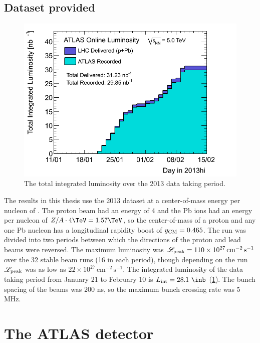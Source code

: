 \subsection{Dataset provided}

\begin{figure}[t]
\includegraphics{sumLumiByDayUrgent.png}
\caption{The total integrated luminosity over the 2013 \pPb data taking period.}
\label{fig:int_lumi}
\end{figure}

The results in this thesis use the 2013 \lhc \pPb dataset at a center-of-mass energy per nucleon of \pPbenergy.
The proton beam had an energy of 4 \TeV and the Pb ions had an energy per nucleon of $Z/A \cdot 4 \TeV = 1.57 \TeV$, so the center-of-mass of a proton and any one Pb nucleon has a longitudinal rapidity boost of $y_{\mathrm{CM}} = 0.465$.
The \pPb run was divided into two periods between which the directions of the proton and lead beams were reversed.
The maximum luminosity was $\mathscr{L}_\textrm{peak} = 110 \times 10^{27} \, \textrm{cm}^{-2} \, \textrm{s}^{-1}$ over the 32 stable beam runs (16 in each period), though depending on the run $\mathscr{L}_\textrm{peak}$ was as low as $22 \times 10^{27} \, \textrm{cm}^{-2} \, \textrm{s}^{-1}$.
The integrated luminosity of the data taking period from January 21 to February 10 is $\Lint = 28.1~\inb$ (\cref{fig:int_lumi}).
The bunch spacing of the beams was 200 ns, so the maximum bunch crossing rate was 5 MHz.

\section{The ATLAS detector}
\label{sec:atlas}

